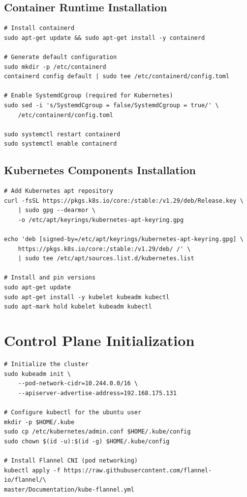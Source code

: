 \documentclass[12pt,a4paper]{report}
\begin{document}
\subsection{Container Runtime Installation}

\begin{lstlisting}[style=bashstyle, caption={containerd Installation}]
# Install containerd
sudo apt-get update && sudo apt-get install -y containerd

# Generate default configuration
sudo mkdir -p /etc/containerd
containerd config default | sudo tee /etc/containerd/config.toml

# Enable SystemdCgroup (required for Kubernetes)
sudo sed -i 's/SystemdCgroup = false/SystemdCgroup = true/' \
    /etc/containerd/config.toml

sudo systemctl restart containerd
sudo systemctl enable containerd
\end{lstlisting}

\subsection{Kubernetes Components Installation}

\begin{lstlisting}[style=bashstyle, caption={kubeadm, kubelet, kubectl Installation}]
# Add Kubernetes apt repository
curl -fsSL https://pkgs.k8s.io/core:/stable:/v1.29/deb/Release.key \
    | sudo gpg --dearmor \
    -o /etc/apt/keyrings/kubernetes-apt-keyring.gpg

echo 'deb [signed-by=/etc/apt/keyrings/kubernetes-apt-keyring.gpg] \
    https://pkgs.k8s.io/core:/stable:/v1.29/deb/ /' \
    | sudo tee /etc/apt/sources.list.d/kubernetes.list

# Install and pin versions
sudo apt-get update
sudo apt-get install -y kubelet kubeadm kubectl
sudo apt-mark hold kubelet kubeadm kubectl
\end{lstlisting}

\section{Control Plane Initialization}

\begin{lstlisting}[style=bashstyle, caption={Master Node Initialization}]
# Initialize the cluster
sudo kubeadm init \
    --pod-network-cidr=10.244.0.0/16 \
    --apiserver-advertise-address=192.168.175.131

# Configure kubectl for the ubuntu user
mkdir -p $HOME/.kube
sudo cp /etc/kubernetes/admin.conf $HOME/.kube/config
sudo chown $(id -u):$(id -g) $HOME/.kube/config

# Install Flannel CNI (pod networking)
kubectl apply -f https://raw.githubusercontent.com/flannel-io/flannel/\
master/Documentation/kube-flannel.yml
\end{lstlisting}
\end{document}
